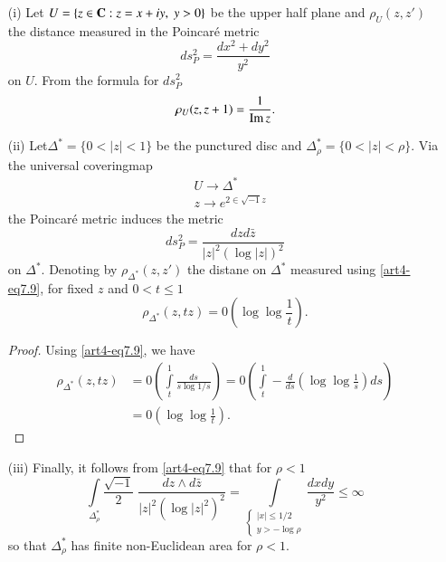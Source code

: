 \begin{itemize}
\item[(i)] Let $U = \{z \in \mathbf{C} : z =x + iy, \; y > 0\}$ be the upper half plane and $\rho_U (z, z')$ the distance measured in the Poincar\'e metric
$$
ds^2_P = \frac{dx^2 + dy^2}{y^2}
$$
on $U$. From the formula for $ds^2_P$ 
\begin{equation} 
\rho_U (z,z+1) = \frac{1}{\operatorname{Im} z}. \label{art4-eq7.8}
\end{equation}

\item[(ii)] Let\pageoriginale $\Delta^\ast = \{0 < |z| < 1 \}$ be the punctured disc and $\Delta^\ast_\rho = \{0< |z| < \rho \}$. Via the universal coveringmap
\begin{align*}
& U \longrightarrow \Delta^\ast\\
& z \longrightarrow e^{2\in \sqrt{-1} z}
\end{align*}
the Poincar\'e metric induces the metric
\begin{equation}
ds^2_P = \frac{dzd\bar{z}}{|z|^2 (\log |z|)^2}
\label{art4-eq7.9}
\end{equation}
on $\Delta^\ast$. Denoting by $\rho_{\Delta^\ast} (z, z')$ the distane on $\Delta^\ast$ measured using  \ref{art4-eq7.9}, for fixed $z$ and $0 < t \leqslant 1$
\begin{equation}
\rho_{\Delta^\ast} (z, tz) =0 (\log \log \frac{1}{t}). \label{art4-eq7.10}
\end{equation}
 
\begin{proof}
Using \ref{art4-eq7.9}, we have
\begin{align*}
\rho_{\Delta^\ast} (z, tz) & = 0 \left(\int\limits^1_t \frac{ds}{s \log 1/s} \right) =0 \left(\int\limits^1_t - \frac{d}{ds} \left(\log \log \frac{1}{s} \right) ds\right)\\
& = 0 \left(\log \log \frac{1}{t} \right).
\end{align*} 
\end{proof}

\item[(iii)] Finally, it follows from  \ref{art4-eq7.9} that for $\rho < 1$
\begin{equation}
\int\limits_{\Delta^\ast_\rho} \frac{\sqrt{-1}}{2} \; \frac{dz \wedge d\bar{z}}{|z|^2 (\log |z|^2)^2} = \int\limits_{\begin{cases} 
|x| \leqslant 1/2\\y > - \log \rho \end{cases}} \frac{dxdy}{y^2} \leqslant \infty \label{art4-eq7.11}
\end{equation}
so that $\Delta^\ast_\rho$ has finite non-Euclidean area for $\rho < 1$.
\end{itemize}

